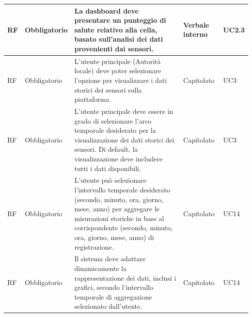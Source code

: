 \documentclass{article}
\begin{document}
\begin{longtable}{|C{1cm}|C{2cm}|>{\raggedright}m{5cm}|C{1.5cm}|C{2cm}|}
    \hline
     RF & Obbligatorio        & La dashboard deve presentare un punteggio di salute relativo alla cella, basato sull'analisi dei dati provenienti dai sensori.                                                                                                     & Verbale interno      & UC2.3               \\
    \hline
     RF & Obbligatorio        & L'utente principale (Autorità locale) deve poter selezionare l'opzione per visualizzare i dati storici dei sensori sulla piattaforma.                                                                                              & Capitolato      & UC3               \\
    \hline
     RF & Obbligatorio        & L'utente principale deve essere in grado di selezionare l'arco temporale desiderato per la visualizzazione dei dati storici dei sensori. Di default, la visualizzazione deve includere tutti i dati disponibili.                   & Capitolato      & UC3               \\
    \hline
     RF & Obbligatorio        & L'utente può selezionare l'intervallo temporale desiderato (secondo, minuto, ora, giorno, mese, anno) per aggregare le misurazioni storiche in base al corrispondente (secondo, minuto, ora, giorno, mese, anno) di registrazione. & Capitolato      & UC14               \\
    \hline
     RF & Obbligatorio        &     Il sistema deve adattare dinamicamente la rappresentazione dei dati, inclusi i grafici, secondo l'intervallo temporale di aggregazione selezionato dall'utente. & Capitolato      & UC14               \\
    \hline


\end{longtable}
\end{document}
